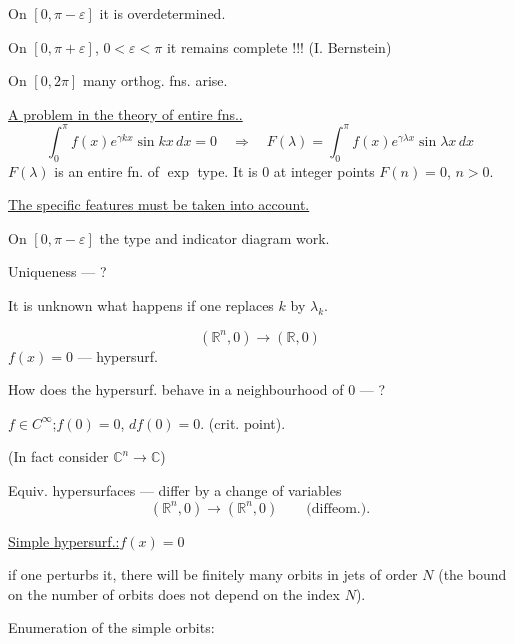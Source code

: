 On $[0,\pi-\varepsilon]$ it is overdetermined.

On $[0,\pi+\varepsilon]$, $0<\varepsilon<\pi$ it remains complete !!! (I. Bernstein)


On $[0,2\pi]$ many orthog. fns. arise.

\uline{A problem in the theory of entire fns..}
\[
\int_0^\pi f(x)e^{\gamma kx}\sin kx\,dx=0
\quad\Longrightarrow\quad
F(\lambda)=\int_0^\pi f(x)e^{\gamma\lambda x}\sin\lambda x\,dx
\]
$F(\lambda)$ is an entire fn. of $\exp$ type. It is 0 at integer points
$F(n)=0$, $n>0$.

\uline{The specific features must be taken into account.}

On $[0,\pi-\varepsilon]$ the type and indicator diagram work.

Uniqueness — ?

It is unknown what happens if one replaces $k$ by $\lambda_k$.



\qquad{}

\[
(\mathbb R^n,0)\longrightarrow(\mathbb R,0)
\]
$f(x)=0$ — hypersurf.

How does the hypersurf. behave in a neighbourhood of $0$ — ?

$f\in C^\infty$;\quad $f(0)=0$, $df(0)=0$. (crit. point).

(In fact consider $\mathbb C^n\longrightarrow\mathbb C$)

Equiv. hypersurfaces — differ by a change of variables
\[
(\mathbb R^n,0)\longrightarrow(\mathbb R^n,0)\qquad
\text{(diffeom.)}.
\]

\uline{Simple hypersurf.:}\qquad\uline{\mbox{$f(x)=0$}}

if one perturbs it, there will be finitely many orbits
in jets of order $N$ (the bound on the number of orbits does not depend on the index $N$).

Enumeration of the simple orbits:



